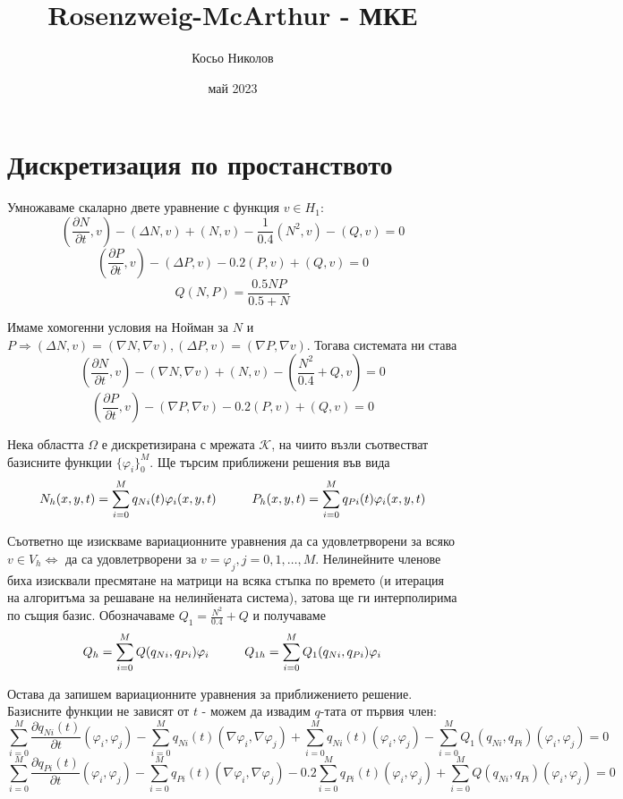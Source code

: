 \documentclass[fleqn,12pt]{article}
\title{Rosenzweig-McArthur - МКЕ}
\author{Косьо Николов}
\date{май 2023}
\begin{document}
    
\maketitle

\tableofcontents
\pagebreak

\section{Дискретизация по простанството}
Умножаваме скаларно двете уравнение с функция $v \in H_1$:
\[ \left(\frac{\partial N}{\partial t}, v\right) - (\Delta N, v) + (N, v) - \frac{1}{0.4} (N^2, v) - (Q, v) = 0\]
\[ \left(\frac{\partial P}{\partial t}, v\right) - (\Delta P, v) - 0.2(P, v) + (Q, v) = 0\]
\[ Q(N, P) = \frac{0.5 NP}{0.5 + N}\]

Имаме хомогенни условия на Нойман за $N$ и $P \Rightarrow (\Delta N, v) = (\nabla N, \nabla v), (\Delta P, v) = (\nabla P, \nabla v)$. 
Тогава системата ни става
\[ \left(\frac{\partial N}{\partial t}, v\right) - (\nabla N, \nabla v) + (N, v) - \left(\frac{N^2}{0.4}  + Q, v\right) = 0\]
\[ \left(\frac{\partial P}{\partial t}, v\right) - (\nabla P, \nabla v) - 0.2(P, v) + (Q, v) = 0\]

Нека областта $\Omega$ е дискретизирана с мрежата $\mathcal{K}$, на чиито възли съотвестват базисните функции
$\{\varphi_i\}_0^M$. Ще търсим приближени решения във вида
\[ N_h(x,y,t) = \sum_{i=0}^M q_{Ni}(t) \varphi_i(x,y,t) \hspace{10mm}
P_h(x,y,t) = \sum_{i=0}^M q_{Pi}(t) \varphi_i(x,y,t) \]

Съответно ще изискваме вариационните уравнения да са удовлетрворени за всяко $v \in V_h \Leftrightarrow$
да са удовлетрворени за $v = \varphi_j, j = 0, 1, \dots, M$.
Нелинейните членове биха изисквали пресмятане на матрици на всяка стъпка по времето (и итерация на алгоритъма за решаване на нелинйената система),
затова ще ги интерполирима по същия базис. Обозначаваме $Q_1 = \frac{N^2}{0.4} + Q$ и получаваме
\[ Q_h = \sum_{i=0}^M Q(q_{Ni}, q_{Pi}) \varphi_i \hspace{10mm}
Q_{1h} = \sum_{i=0}^M Q_1(q_{Ni}, q_{Pi}) \varphi_i \]

Остава да запишем вариационните уравнения за приближението решение. Базисните функции не зависят от $t$ - можем да
извадим $q$-тата от първия член:
\[ \sum_{i=0}^M \frac{\partial q_{Ni}(t)}{\partial t} (\varphi_i, \varphi_j) - \sum_{i=0}^M q_{Ni}(t) (\nabla \varphi_i, \nabla \varphi_j) + \sum_{i=0}^M q_{Ni}(t) (\varphi_i, \varphi_j) - \sum_{i=0}^M Q_1(q_{Ni}, q_{Pi})(\varphi_i, \varphi_j) = 0\]
\[ \sum_{i=0}^M \frac{\partial q_{Pi}(t)}{\partial t} (\varphi_i, \varphi_j) - \sum_{i=0}^M q_{Pi}(t) (\nabla \varphi_i, \nabla \varphi_j) - 0.2\sum_{i=0}^M q_{Pi}(t) (\varphi_i, \varphi_j) + \sum_{i=0}^M Q(q_{Ni}, q_{Pi})(\varphi_i, \varphi_j) = 0\]
\end{document}
